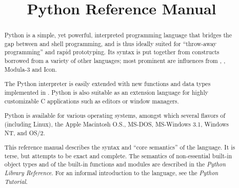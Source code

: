 \documentclass{manual}
\title{Python Reference Manual}
\begin{document}
\maketitle



\begin{abstract}

\noindent
Python is a simple, yet powerful, interpreted programming language
that bridges the gap between \C{} and shell programming, and is thus
ideally suited for ``throw-away programming'' and rapid prototyping.
Its syntax is put together from constructs borrowed from a variety of
other languages; most prominent are influences from \ABC, \C, Modula-3
and Icon.

The Python interpreter is easily extended with new functions and data
types implemented in \C{}.  Python is also suitable as an extension
language for highly customizable C applications such as editors or
window managers.

Python is available for various operating systems, amongst which
several flavors of \UNIX{} (including Linux), the Apple Macintosh O.S.,
MS-DOS, MS-Windows 3.1, Windows NT, and OS/2.

This reference manual describes the syntax and ``core semantics'' of
the language.  It is terse, but attempts to be exact and complete.
The semantics of non-essential built-in object types and of the
built-in functions and modules are described in the \emph{Python
Library Reference}.  For an informal introduction to the language, see
the \emph{Python Tutorial}.

\end{abstract}

\tableofcontents



\end{document}
